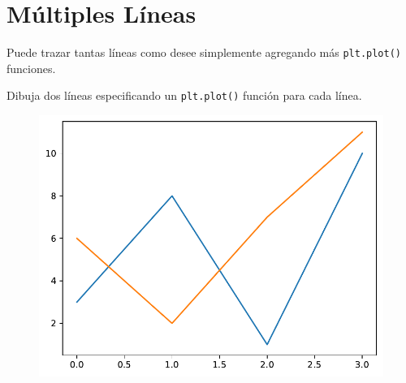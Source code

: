 \section{Múltiples Líneas}

Puede trazar tantas líneas como desee simplemente agregando más \texttt{plt.plot()} funciones.\\

\begin{code} Dibuja dos líneas especificando un \texttt{plt.plot()} función para cada línea.

\begin{Shaded}
\begin{Highlighting}[]

\OperatorTok{=}\NormalTok{ np.array([}\NormalTok{, }\NormalTok{, }\NormalTok{, }\NormalTok{])}
\OperatorTok{=}\NormalTok{ np.array([}\NormalTok{, }\NormalTok{, }\NormalTok{, }\NormalTok{])}


\end{Highlighting}
\end{Shaded}

\begin{figure}
  \centering
  \includegraphics[scale=0.6]{img/grafica1021.pdf}
\end{figure}
\end{code}

